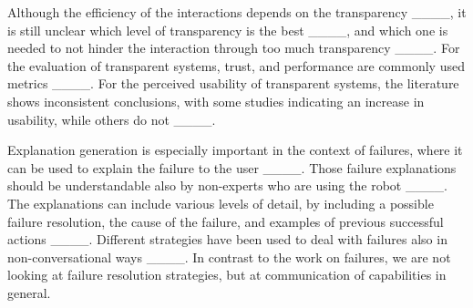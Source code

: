 Although the efficiency of the interactions depends on the transparency ____, it is still unclear which level of transparency is the best ____, and which one is needed to not hinder the interaction through too much transparency ____.
For the evaluation of transparent systems, trust, and performance are commonly used metrics ____. For the perceived usability of transparent systems, the literature shows inconsistent conclusions, with some studies indicating an increase in usability, while others do not ____.

Explanation generation is especially important in the context of failures, where it can be used to explain the failure to the user ____. Those failure explanations should be understandable also by non-experts who are using the robot ____. The explanations can include various levels of detail, by including a possible failure resolution, the cause of the failure, and examples of previous successful actions ____. Different strategies have been used to deal with failures also in non-conversational ways ____. In contrast to the work on failures, we are not looking at failure resolution strategies, but at communication of capabilities in general.